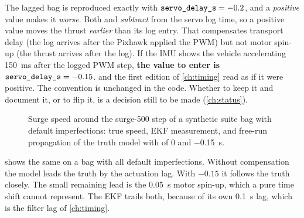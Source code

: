 \begin{caution}[title={The sign of \code{servo_delay_s}}]
The lagged bag is reproduced exactly with $\code{servo_delay_s} = -0.2$, and a \emph{positive}
value makes it \emph{worse}. Both  and 
\emph{subtract}  from the servo log time, so a positive value moves the
thrust \emph{earlier} than its log entry. That compensates transport delay (the log arrives after
the Pixhawk applied the PWM) but not motor spin-up (the thrust arrives after the log). If the IMU
shows the vehicle accelerating \qty{150}{\milli\second} after the logged PWM step,
\textbf{the value to enter is $\code{servo_delay_s} = -0.15$}.
 and the first edition of \cref{ch:timing} read as if it were positive. The
convention is unchanged in the code. Whether to keep it and document it, or to flip it, is a
decision still to be made (\cref{ch:status}).
\end{caution}

\begin{figure}[htbp]
\centering
{}
\caption{Surge speed around the surge-500 step of a synthetic suite bag with default
imperfections: true speed, EKF measurement, and free-run propagation of the truth model with
 of \num{0} and \qty{-0.15}{\second}.}
\label{fig:synth-step}
\end{figure}
\FloatBarrier

 shows the same on a bag with all default imperfections. Without
compensation the model leads the truth by the actuation lag. With $-0.15$ it follows the
truth closely. The small remaining lead is the \qty{0.05}{\second} motor spin-up, which a pure
time shift cannot represent. The EKF trails both, because of its own
\qty{0.1}{\second} lag, which is the filter lag of \cref{ch:timing}.

